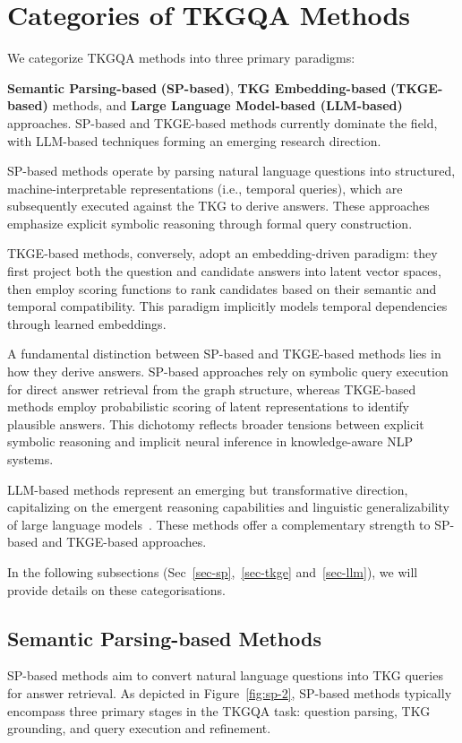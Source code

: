 \section{Categories of TKGQA Methods\label{sec-method}}
We categorize TKGQA methods into three primary paradigms: {\textbf{Semantic Parsing-based} \textbf{(SP-based)}, \textbf{TKG Embedding-based} \textbf{(TKGE-based)} methods, and \textbf{Large Language Model-based (LLM-based)} approaches. SP-based and TKGE-based methods currently dominate the field, with LLM-based techniques forming an emerging research direction.

SP-based methods operate by parsing natural language questions into structured, machine-interpretable representations (i.e., temporal queries), which are subsequently executed against the TKG to derive answers. These approaches emphasize explicit symbolic reasoning through formal query construction.

TKGE-based methods, conversely, adopt an embedding-driven paradigm: they first project both the question and candidate answers into latent vector spaces, then employ scoring functions to rank candidates based on their semantic and temporal compatibility. This paradigm implicitly models temporal dependencies through learned embeddings.

A fundamental distinction between SP-based and TKGE-based methods lies in how they derive answers. SP-based approaches rely on symbolic query execution for direct answer retrieval from the graph structure, whereas TKGE-based methods employ probabilistic scoring of latent representations to identify plausible answers. This dichotomy reflects broader tensions between explicit symbolic reasoning and implicit neural inference in knowledge-aware NLP systems.

LLM-based methods represent an emerging but transformative direction, capitalizing on the emergent reasoning capabilities and linguistic generalizability of large language models~\cite{xiong2024largelanguagemodelslearn}. These methods offer a complementary strength to SP-based and TKGE-based approaches. 

In the following subsections (Sec~\ref{sec-sp},~\ref{sec-tkge} and~\ref{sec-llm}), we will provide details on these categorisations.

\subsection{Semantic Parsing-based Methods\label{sec-sp}}
SP-based methods aim to convert natural language questions into TKG queries for answer retrieval. 
As depicted in Figure~\ref{fig:sp-2}, SP-based methods typically encompass three primary stages in the TKGQA task: question parsing, TKG grounding, and query execution and refinement. 

}
